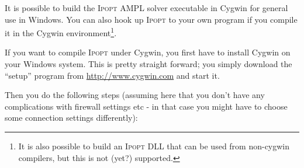 \documentclass[10pt]{article}
\newcommand{\Ipopt}{\textsc{Ipopt}\xspace}
\begin{document}
It is possible to build the \Ipopt AMPL solver executable in Cygwin
for general use in Windows.  You can also hook up \Ipopt to your own
program if you compile it in the Cygwin environment\footnote{It is
  also possible to build an \Ipopt DLL that can be used from
  non-cygwin compilers, but this is not (yet?) supported.}.

If you want to compile \Ipopt under Cygwin, you first have to install
Cygwin on your Windows system.  This is pretty straight forward; you
simply download the ``setup'' program from
\url{http://www.cygwin.com} and start it.

Then you do the following steps (assuming here that you don't have any
complications with firewall settings etc - in that case you might have
to choose some connection settings differently):

\end{document}

